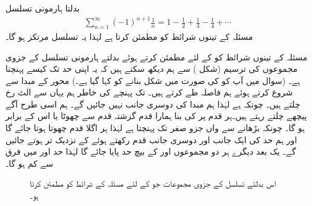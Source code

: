بدلتا ہارمونی تسلسل
\begin{align*}
\sum_{n=1}^{\infty}(-1)^{n+1}\frac{1}{n}=1-\frac{1}{2}+\frac{1}{3}-\frac{1}{4}+\cdots
\end{align*}
مسئلہ  کے تینوں شرائط کو مطمئن کرتا ہے لہٰذا یہ تسلسل مرتکز ہو گا۔

مسئلہ  کے تینوں شرائط کو  کے لئے مطمئن کرتے ہوئے بدلتے ہارمونی تسلسل کے جزوی مجموعوں کی ترسیم (شکل ) سے ہم دیکھ سکتے ہیں کہ یہ اپنی حد  تک کیسے پہنچتا ہے۔ (سوال  میں آپ کو  کی صورت میں شکل بنانے کو کہا گیا ہے۔) محور  کے مبدا سے شروع کرتے ہوئے ہم  فاصلہ طے کرتے ہیں۔  تک پہنچے کی خاطر ہم یہاں سے الٹ رخ  چلتے ہیں۔ چونکہ  ہے لہٰذا ہم مبدا کی دوسری جانب نہیں جائیں گے۔ ہم اسی طرح آگے پیچھے چلتے رہتے ہیں۔ہر  قدم پر  کی بنا ہمارا قدم گزشتہ قدم سے چھوٹا یا اس کے برابر ہو گا۔ چونکہ  بڑھانے سے  واں جزو صفر تک پہنچتا ہے لہٰذا ہر اگلا قدم  چھوتا ہوتا جائے گا اور ہم حد  کی ایک جانب اور دوسری جانب قدم رکھتے ہوئے  کے نزدیک تر ہوتے جائیں گے۔ یک بعد دیگرے ہر دو مجموعوں  اور  کے بیچ  حد  پایا جائے گا لہٰذا حد اور  میں فرق  سے کم ہو گا۔
\begin{figure}
\centering
{}
\caption{
اس بدلتے  تسلسل کے جزوی مجموعات جو  کے لئے مسئلہ  کے شرائط کو مطمئن کرتا ہو۔
}
\label{شکل_تسلسل_بدلتے_ہندسی_تسلسل_کے_جزوی_مجموعات}
\end{figure}

